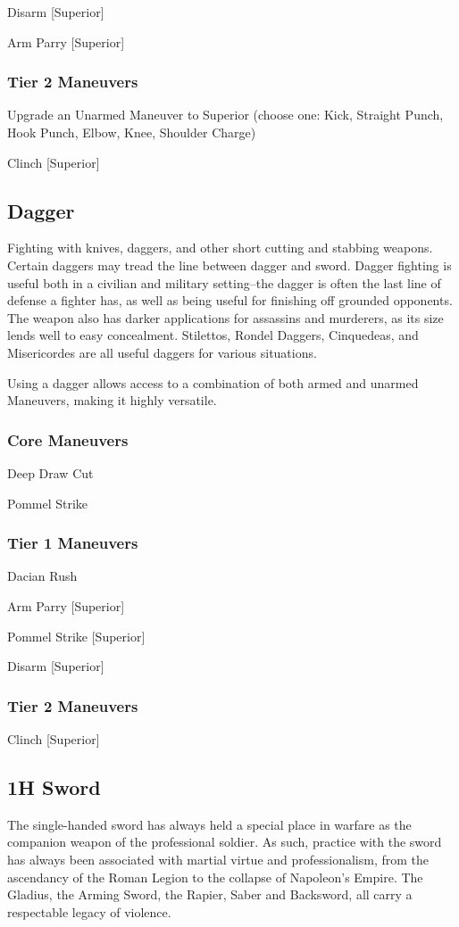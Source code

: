 \documentclass[oneside,11pt,english]{book}
\begin{document}
Disarm [Superior] 

Arm Parry [Superior] 

\subsubsection{Tier 2 Maneuvers}
Upgrade an Unarmed Maneuver to Superior (choose one: Kick, Straight Punch, Hook Punch, 
Elbow, Knee, Shoulder Charge) 

Clinch [Superior]

\subsection{Dagger}
Fighting with knives, daggers, and other short cutting and stabbing weapons. Certain daggers may tread 
the line between dagger and sword. Dagger fighting is useful both in a civilian and military setting--the 
dagger is often the last line of defense a fighter has, as well as being useful for finishing off grounded 
opponents. The weapon also has darker applications for assassins and murderers, as its size lends well to 
easy concealment. Stilettos, Rondel Daggers, Cinquedeas, and Misericordes are all useful daggers for 
various situations. 

Using a dagger allows access to a combination of both armed and unarmed Maneuvers, making it highly 
versatile. 

\subsubsection{Core Maneuvers}
Deep Draw Cut 

Pommel Strike 

\subsubsection{Tier 1 Maneuvers}
Dacian Rush

Arm Parry [Superior]

Pommel Strike [Superior]

Disarm [Superior]

\subsubsection{Tier 2 Maneuvers}
Clinch [Superior]

\subsection{1H Sword}
The single-handed sword has always held a special place in warfare as the companion weapon of the 
professional soldier. As such, practice with the sword has always been associated with martial virtue and 
professionalism, from the ascendancy of the Roman Legion to the collapse of Napoleon’s Empire. The 
Gladius, the Arming Sword, the Rapier, Saber and Backsword, all carry a respectable legacy of violence. 
\end{document}
